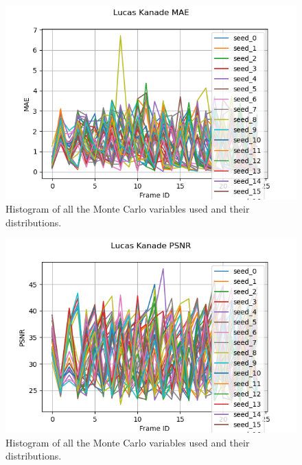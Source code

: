\documentclass[11pt, conference, letterpaper]{IEEEtran}
\begin{document}
\begin{figure}[h]
    \centering
    \includegraphics[width=\linewidth]{mc_images/mc_lk_mae.png}
    \caption{Histogram of all the Monte Carlo variables used and their distributions.}
    \label{fig:mc_lk_mae}
\end{figure}

\begin{figure}[h]
    \centering
    \includegraphics[width=\linewidth]{mc_images/mc_lk_psnr.png}
    \caption{Histogram of all the Monte Carlo variables used and their distributions.}
    \label{fig:mc_lk_psnr}
\end{figure}
\end{document}
